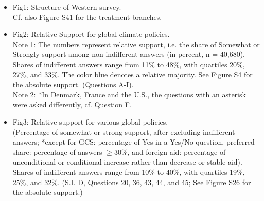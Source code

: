 \documentclass[12pt,english]{article}
\begin{document}
\begin{itemize}
  \item Fig1: Structure of Western survey.\\ Cf. also Figure S41 for the treatment branches.
  \item Fig2: Relative Support for global climate policies. \\
  Note 1: The numbers represent relative support, i.e. the share of Somewhat or Strongly support among non-indifferent answers (in percent, n = 40,680). Shares of indifferent answers range from 11\% to 48\%, with quartiles 20\%, 27\%, and 33\%. The color blue denotes a relative majority. See Figure S4 for the absolute support. (Questions A-I).\\
  Note 2: *In Denmark, France and the U.S., the questions with an asterisk were asked differently, cf. Question F.
  \item Fig3: Relative support for various global policies.\\ (Percentage of somewhat or strong support, after excluding indifferent answers; *except for GCS: percentage of Yes in a Yes/No question, preferred share: percentage of answers $\geq$30\%, and foreign aid: percentage of  unconditional or conditional increase rather than decrease or stable aid). Shares of indifferent answers range from 10\% to 40\%, with quartiles 19\%, 25\%, and 32\%. (S.I. D, %
  Questions 20, 36, 43, 44, and 45; See Figure S26 for the absolute support.)

\end{itemize}
\end{document}
